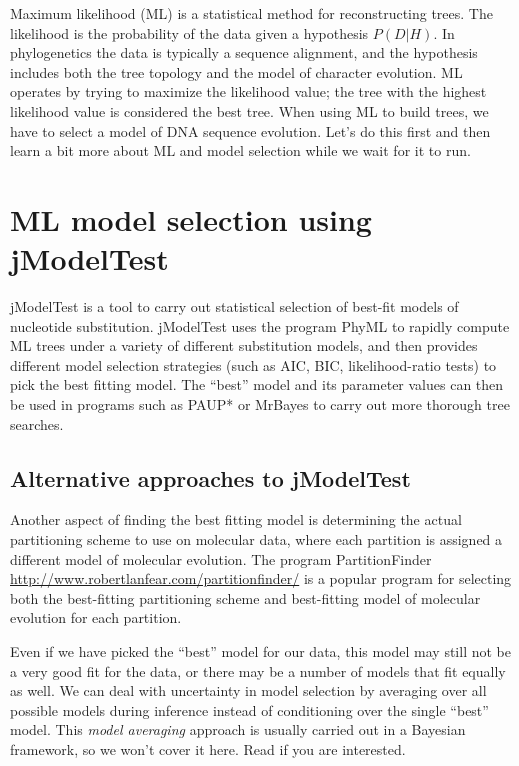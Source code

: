 \documentclass[11pt]{article}
\begin{document}
Maximum likelihood (ML) is a statistical method for reconstructing trees.  
The likelihood is the probability of the data given a hypothesis $P(D|H)$.
In phylogenetics the data is typically a sequence alignment, and the hypothesis includes
both the tree topology and the model of character evolution.
ML operates by trying to maximize the
likelihood value;
the tree with the highest likelihood value is considered the best tree.  
When using ML to build trees, 
we have to select a model of DNA sequence evolution. 
Let's do this first and then learn a bit more about ML and model selection while we wait for it to run.

\section{ML model selection using jModelTest}

jModelTest \citep{darriba2012jmodeltest} is a tool to carry out statistical selection of best-fit models of nucleotide substitution.
jModelTest uses the program PhyML \citep{guindon2010new}
to rapidly compute ML trees under a variety of different substitution models,
and then provides different model selection strategies (such as AIC, BIC, likelihood-ratio tests)
to pick the best fitting model.
The ``best'' model and its parameter values can then be used in 
programs such as PAUP* or MrBayes to carry out more thorough tree searches.

\subsection{Alternative approaches to jModelTest}

Another aspect of finding the best fitting model is
determining the actual partitioning scheme to use on molecular data,
where each partition is assigned a different model of molecular evolution.
The program PartitionFinder \url{http://www.robertlanfear.com/partitionfinder/} 
is a popular program for selecting both 
the best-fitting partitioning
scheme and best-fitting model of molecular evolution for each partition.

Even if we have picked the ``best'' model for our data, this model may still not be a very good
fit for the data, or there may be a number of models that fit equally as well.
We can deal with uncertainty in model selection by averaging over all possible
models during inference instead of conditioning over the single ``best'' model.
This \textit{model averaging} approach is usually carried out in a Bayesian framework,
so we won't cover it here. Read \citet{huelsenbeck2004bayesian} if you are interested.
\end{document}

